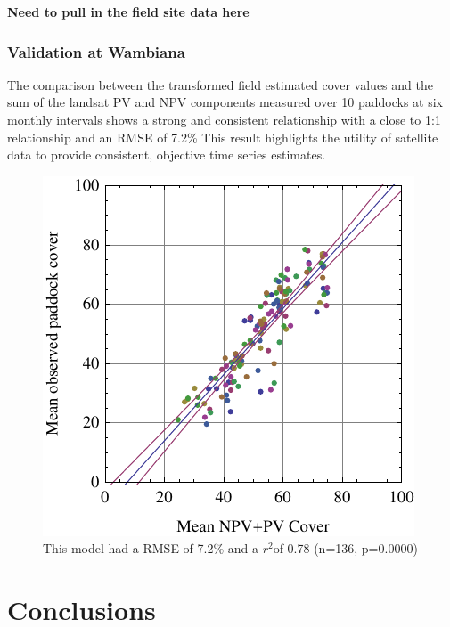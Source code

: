 \documentclass[remotesensing,article,accept,moreauthors,pdftex,12pt,a4paper]{mdpi}
\begin{document}
\textbf{Need to pull in the field site data here }

\subsubsection{Validation at Wambiana}

The comparison between the transformed field estimated cover values and the sum of the landsat PV and NPV components measured over 10 paddocks at six monthly intervals shows a strong and consistent relationship with a close to 1:1 relationship and an RMSE of 7.2\% This result highlights the utility of satellite data to provide consistent, objective time series estimates.

\begin{figure} 

\includegraphics{wambianaComparePlot.pdf}
\caption{\label{fig:wambianaCoverCompare}This model had a RMSE of 7.2\% and a $r^{2}$of 0.78 (n=136, p=0.0000)} 

\end{figure} 


\section{Conclusions}
\end{document}
